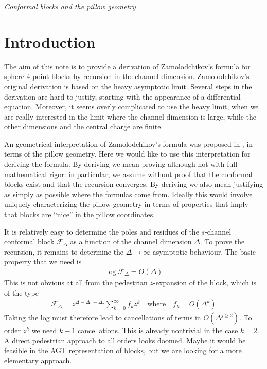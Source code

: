 \documentclass[12pt,a4paper]{article}
\newcommand \versionno{\jobname.tex}
\begin{document}
\typeout{}\typeout{\versionno}\typeout{} \begin{center} \fbox{\texttt{\versionno\ -- } {\small \today\ }} \end{center}

\vspace{2mm}

\begin{center}
 \textit{ \Huge Conformal blocks and the pillow geometry}
\end{center}

\tableofcontents

\section{Introduction}

The aim of this note is to provide a derivation of Zamolodchikov's formula for sphere 4-point blocks by recursion in the channel dimension. Zamolodchikov's original derivation \cite{zam87b} is based on the heavy asymptotic limit. Several steps in the derivation are hard to justify, starting with the appearance of a differential equation. Moreover, it seems overly complicated to use the heavy limit, when we are really interested in the limit where the channel dimension is large, while the other dimensions and the central charge are finite. 

An geometrical interpretation of Zamolodchikov's formula was proposed in \cite{msz15}, in terms of the pillow geometry. Here we would like to use this interpretation for deriving the formula. By deriving we mean proving although not with full mathematical rigor: in particular, we assume without proof that the conformal blocks exist and that the recursion converges. By deriving we also mean justifying as simply as possible where the formulas come from. Ideally this would involve uniquely characterizing the pillow geometry in terms of properties that imply that blocks are ``nice'' in the pillow coordinates. 

It is relatively easy to determine the poles and residues of the $s$-channel conformal block $\mathcal{F}_\Delta$ as a function of the channel dimension $\Delta$. To prove the recursion, it remains to determine the $\Delta\to\infty$ asymptotic behaviour. The basic property that we need is 
\begin{align}
 \log \mathcal{F}_\Delta = O(\Delta)
\end{align}
This is not obvious at all from the pedestrian $z$-expansion of the block, which is of the type 
\begin{align}
 \mathcal{F}_\Delta = z^{\Delta-\Delta_1-\Delta_2}\sum_{k=0}^\infty f_k z^k \quad \text{where} \quad f_k =   O(\Delta^k)
 \label{fk}
\end{align}
Taking the log must therefore lead to cancellations of terms in $O(\Delta^{j\geq 2})$. To order $z^k$ we need $k-1$ cancellations. This is already nontrivial in the case $k=2$. A direct pedestrian approach to all orders looks doomed. Maybe it would be feasible in the AGT representation of blocks, but we are looking for a more elementary approach. 
\end{document}
